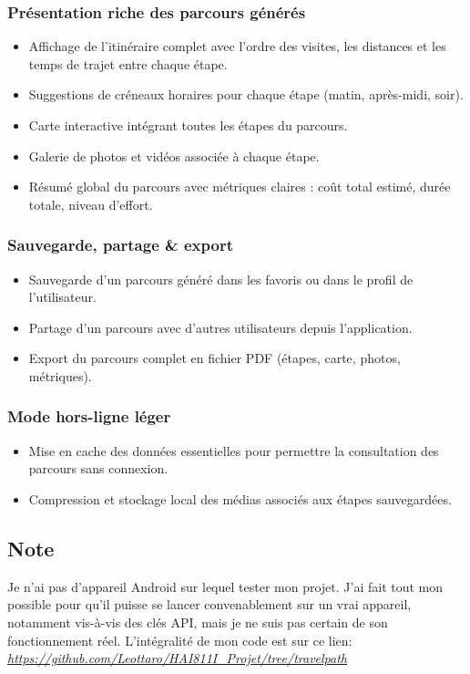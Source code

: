 \documentclass[a4paper, 12pt]{article}
\begin{document}
\begin{justify}
\subsubsection*{Présentation riche des parcours générés}
\begin{itemize}
    \item Affichage de l'itinéraire complet avec l'ordre des visites, les distances et les temps de trajet entre chaque étape.
    \item Suggestions de créneaux horaires pour chaque étape (matin, après-midi, soir).
    \item Carte interactive intégrant toutes les étapes du parcours.
    \item Galerie de photos et vidéos associée à chaque étape.
    \item Résumé global du parcours avec métriques claires : coût total estimé, durée totale, niveau d'effort.
\end{itemize}

\subsubsection*{Sauvegarde, partage \& export}
\begin{itemize}
    \item Sauvegarde d'un parcours généré dans les favoris ou dans le profil de l'utilisateur.
    \item Partage d'un parcours avec d'autres utilisateurs depuis l'application.
    \item Export du parcours complet en fichier PDF (étapes, carte, photos, métriques).
\end{itemize}

\subsubsection*{Mode hors-ligne léger}
\begin{itemize}
    \item Mise en cache des données essentielles pour permettre la consultation des parcours sans connexion.
    \item Compression et stockage local des médias associés aux étapes sauvegardées.
\end{itemize}

\subsection*{Note}

Je n'ai pas d'appareil Android sur lequel tester mon projet. J'ai fait tout mon possible pour qu'il puisse se lancer convenablement sur un vrai appareil, notamment vis-à-vis des clés API, mais je ne suis pas certain de son fonctionnement réel.
L'intégralité de mon code est sur ce lien: \textit{\url{https://github.com/Leottaro/HAI811I_Projet/tree/travelpath}}

\end{justify}
\end{document}
